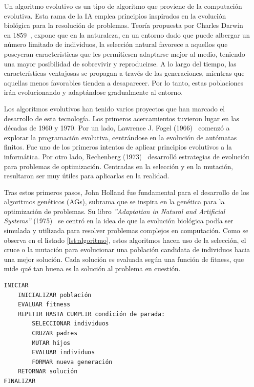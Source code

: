 Un algoritmo evolutivo es un tipo de algoritmo que proviene de la computación evolutiva. Esta rama de la IA emplea principios inspirados en la evolución biológica para la resolución de problemas. Teoría propuesta por Charles Darwin en 1859~\cite{darwin1859}, expone que en la naturaleza, en un entorno dado que puede albergar un número limitado de individuos, la selección natural favorece a aquellos que poseyeran características que les permitiesen adaptarse mejor al medio, teniendo una mayor posibilidad de sobrevivir y reproducirse. A lo largo del tiempo, las características ventajosas se propagan a través de las generaciones, mientras que aquellas menos favorables tienden a desaparecer. Por lo tanto, estas poblaciones irán evolucionando y adaptándose gradualmente al entorno.

Los algoritmos evolutivos han tenido varios proyectos que han marcado el desarrollo de esta tecnología. Los primeros acercamientos tuvieron lugar en las décadas de 1960 y 1970. Por un lado, Lawrence J. Fogel (1966)~\cite{fogel1966} comenzó a explorar la programación evolutiva, centrándose en la evolución de autómatas finitos. Fue uno de los primeros intentos de aplicar principios evolutivos a la informática. Por otro lado, Rechenberg (1973)~\cite{rechenberg1973} desarrolló estrategias de evolución para problemas de optimización. Centradas en la selección y en la mutación, resultaron ser muy útiles para aplicarlas en la realidad.

Tras estos primeros pasos, John Holland fue fundamental para el desarrollo de los algoritmos genéticos (AGs), subrama que se inspira en la genética para la optimización de problemas. Su libro \textit{''Adaptation in Natural and Artificial Systems''} (1975)~\cite{holland1975} se centró en la idea de que la evolución biológica podía ser simulada y utilizada para resolver problemas complejos en computación. Como se observa en el listado \ref{lst:algoritmo}, estos algoritmos hacen uso de la selección, el cruce o la mutación para evolucionar una población candidata de individuos hacia una mejor solución. Cada solución es evaluada según una función de fitness, que mide qué tan buena es la solución al problema en cuestión.
\newpage
\begin{lstlisting}[caption=Algoritmo evolutivo., label={lst:algoritmo}]
INICIAR
    INICIALIZAR población
    EVALUAR fitness
    REPETIR HASTA CUMPLIR condición de parada:
        SELECCIONAR individuos
        CRUZAR padres
        MUTAR hijos
        EVALUAR individuos
        FORMAR nueva generación
    RETORNAR solución
FINALIZAR
\end{lstlisting}

